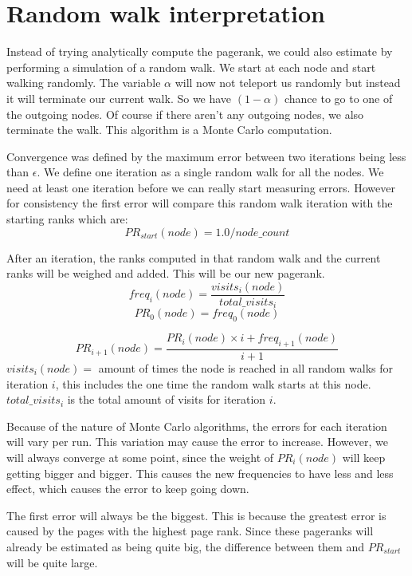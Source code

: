 \documentclass{article}
\begin{document}


\section{Random walk interpretation}
Instead of trying analytically compute the pagerank, we could also estimate by performing a simulation of a random walk. We start at each node and start walking randomly. The variable $\alpha$ will now not teleport us randomly but instead it will terminate our current walk. So we have $(1-\alpha)$ chance to go to one of the outgoing nodes. Of course if there aren't any outgoing nodes, we also terminate the walk. This algorithm is a Monte Carlo computation. 

Convergence was defined by the maximum error between two iterations being less than $\epsilon$. We define one iteration as a single random walk for all the nodes. We need at least one iteration before we can really start measuring errors. However for consistency the first error will compare this random walk iteration with the starting ranks which are: 
$$ PR_{start}(node) = 1.0 / node\_count $$

After an iteration, the ranks computed in that random walk and the current ranks will be weighed and added. This will be our new pagerank. 
$$ freq_i(node) = \frac{visits_i(node)}{total\_visits_i}$$
$$ PR_0(node) = freq_0(node) $$

$$ PR_{i+1}(node) = \frac{PR_i(node) \times i + freq_{i+1}(node)}{i+1}$$
$visits_i(node) = $ amount of times the node is reached in all random walks for iteration $i$, this includes the one time the random walk starts at this node. 
$total\_visits_i$ is the total amount of visits for iteration $i$.

Because of the nature of Monte Carlo algorithms, the errors for each iteration will vary per run. This variation may cause the error to increase. However, we will always converge at some point, since the weight of $PR_i(node)$ will keep getting bigger and bigger. This causes the new frequencies to have less and less effect, which causes the error to keep going down. 

The first error will always be the biggest. This is because the greatest error is caused by the pages with the highest page rank. Since these pageranks will already be estimated as being quite big, the difference between them and $PR_{start}$ will be quite large. 
\end{document}
